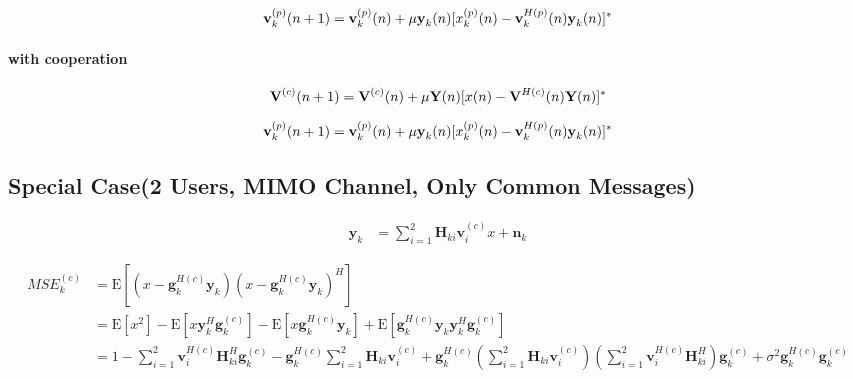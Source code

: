 \documentclass[11pt, oneside]{article}   	%
\begin{document}
\begin{align*}
\textbf{v}^{(p)}_{k}(n+1)= \textbf{v}^{(p)}_{k}(n)+ \mu \textbf y_k(n) [x_k^{(p)}(n)- \textbf{v}^{H(p)}_{k}(n) \textbf y_k(n)]^*
\end{align*}


\paragraph{with cooperation}


\begin{align*}
\textbf{V}^{(c)}(n+1)= \textbf{V}^{(c)}(n)+ \mu \textbf Y(n) [x(n)- \textbf{V}^{H(c)}(n) \textbf Y(n)	]^*
\end{align*}

\begin{align*}
\textbf{v}^{(p)}_{k}(n+1)= \textbf{v}^{(p)}_{k}(n)+ \mu \textbf y_k(n) [x_k^{(p)}(n)- \textbf{v}^{H(p)}_{k}(n) \textbf y_k(n)]^*
\end{align*}

\subsection{Special Case(2 Users,  MIMO Channel, Only Common Messages)}
\begin{align*}
\textbf{y}_{k} &=	\displaystyle\sum_{i=1}^{2}\textbf{H}_{ki}\textbf{v}^{(c)}_{i}x	+	\textbf{n}_{k}
\end{align*}

\begin{align*}
MSE^{(c)}_{k} &= \mathrm{E}	[	(	x-\textbf{g}^{H(c)}_{k}	\textbf{y}_{k}	)(x-\textbf{g}^{H(c)}_{k}	\textbf{y}_{k})^{H}	] \\
		       & = \mathrm{E}[x^{2}]	 - \mathrm{E}[x	\textbf{y}_{k}^{H} \textbf{g}^{(c)}_{k}]	
		       					-  \mathrm{E}[x	\textbf{g}_{k}^{H(c)} \textbf{y}_{k}]
							+ \mathrm{E}[\textbf{g}_{k}^{H(c)} \textbf{y}_{k}	\textbf{y}_{k}^{H} \textbf{g}^{(c)}_{k}]			\\
		       & = 1 - \displaystyle\sum_{i=1}^{2}	\textbf{v}^{H(c)}_{i}	\textbf{H}^{H}_{ki}	\textbf{g}^{(c)}_{k}
		       		- \textbf{g}^{H(c)}_{k}		\displaystyle\sum_{i=1}^{2}	\textbf{H}_{ki}	\textbf{v}^{(c)}_{i}
				+\textbf{g}^{H(c)}_{k}		(\displaystyle\sum_{i=1}^{2}\textbf{H}_{ki}\textbf{v}^{(c)}_{i})
									(\displaystyle\sum_{i=1}^{2}\textbf{v}^{H(c)}_{i}\textbf{H}^{H}_{ki})	\textbf{g}^{(c)}_{k}
				+\sigma^2		\textbf{g}^{H(c)}_{k}	 \textbf{g}^{(c)}_{k}
\end{align*}
\end{document}
